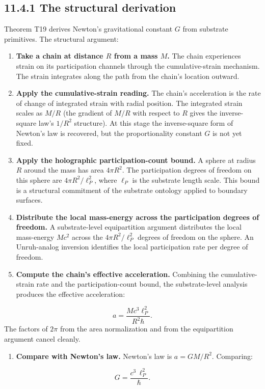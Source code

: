 \documentclass[11pt]{book}
\begin{document}
\subsection{11.4.1 The structural derivation}

Theorem T19 derives Newton's gravitational constant $G$ from substrate primitives. The structural argument:

\begin{enumerate}
\item \textbf{Take a chain at distance $R$ from a mass $M$.} The chain experiences strain on its participation channels through the cumulative-strain mechanism. The strain integrates along the path from the chain's location outward.
\item \textbf{Apply the cumulative-strain reading.} The chain's acceleration is the rate of change of integrated strain with radial position. The integrated strain scales as $M/R$ (the gradient of $M/R$ with respect to $R$ gives the inverse-square law's $1/R^2$ structure). At this stage the inverse-square form of Newton's law is recovered, but the proportionality constant $G$ is not yet fixed.
\item \textbf{Apply the holographic participation-count bound.} A sphere at radius $R$ around the mass has area $4\pi R^2$. The participation degrees of freedom on this sphere are $4\pi R^2/\ell_P^2$, where $\ell_P$ is the substrate length scale. This bound is a structural commitment of the substrate ontology applied to boundary surfaces.
\item \textbf{Distribute the local mass-energy across the participation degrees of freedom.} A substrate-level equipartition argument distributes the local mass-energy $Mc^2$ across the $4\pi R^2/\ell_P^2$ degrees of freedom on the sphere. An Unruh-analog inversion identifies the local participation rate per degree of freedom.
\item \textbf{Compute the chain's effective acceleration.} Combining the cumulative-strain rate and the participation-count bound, the substrate-level analysis produces the effective acceleration:
\end{enumerate}
\[
a = \frac{M c^3 \ell_P^2}{R^2 \hbar}.
\]
   The factors of $2\pi$ from the area normalization and from the equipartition argument cancel cleanly.
\begin{enumerate}
\item \textbf{Compare with Newton's law.} Newton's law is $a = GM/R^2$. Comparing:
\end{enumerate}
\[
G = \frac{c^3\,\ell_P^2}{\hbar}.
\]
\end{document}
